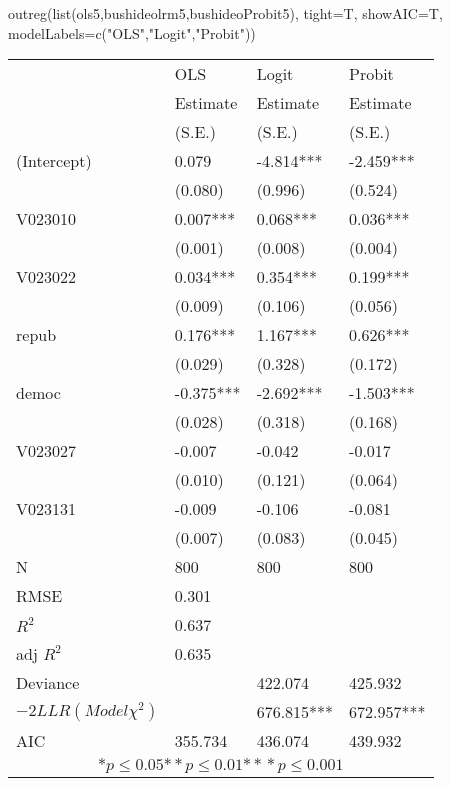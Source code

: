 \begin{Schunk}
\begin{Sinput}
 outreg(list(ols5,bushideolrm5,bushideoProbit5), tight=T, showAIC=T, modelLabels=c("OLS","Logit","Probit"))
\end{Sinput}
\begin{tabular}{*{4}{l}}
\hline
     &  OLS&  Logit&  Probit\tabularnewline
   & Estimate & Estimate & Estimate \tabularnewline
    & (S.E.) & (S.E.) & (S.E.)\tabularnewline
 \hline
 \hline
  (Intercept)    &0.079 &-4.814*** &-2.459*** \tabularnewline
     &  (0.080) &  (0.996) &  (0.524)\tabularnewline
  V023010    &0.007*** &0.068*** &0.036*** \tabularnewline
     &  (0.001) &  (0.008) &  (0.004)\tabularnewline
  V023022    &0.034*** &0.354*** &0.199*** \tabularnewline
     &  (0.009) &  (0.106) &  (0.056)\tabularnewline
  repub    &0.176*** &1.167*** &0.626*** \tabularnewline
     &  (0.029) &  (0.328) &  (0.172)\tabularnewline
  democ    &-0.375*** &-2.692*** &-1.503*** \tabularnewline
     &  (0.028) &  (0.318) &  (0.168)\tabularnewline
  V023027    &-0.007 &-0.042 &-0.017 \tabularnewline
     &  (0.010) &  (0.121) &  (0.064)\tabularnewline
  V023131    &-0.009 &-0.106 &-0.081 \tabularnewline
     &  (0.007) &  (0.083) &  (0.045)\tabularnewline
 \hline
 N & 800 & 800 & 800 \tabularnewline
 RMSE             &0.301   &       &       \tabularnewline
 $R^2$             &0.637   &       &       \tabularnewline
 adj $R^2$         &0.635   &       &       \tabularnewline
 Deviance         &       &422.074   &425.932   \tabularnewline
 $-2LLR (Model \chi^2)$  &  &   676.815*** &   672.957*** \tabularnewline
 AIC & 355.734 & 436.074 & 439.932\tabularnewline
 \hline
\hline
 
 \multicolumn{4}{c}{${*  p}\le 0.05$${*\!\!*  p}\le 0.01$${*\!\!*\!\!*  p}\le 0.001$}\tabularnewline
 \end{tabular}\end{Schunk}
